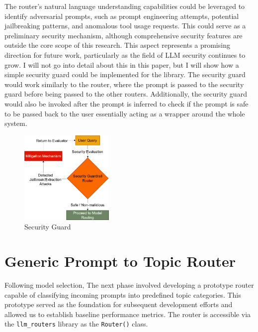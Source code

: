 The router's natural language understanding capabilities could be leveraged to identify adversarial prompts, such as prompt engineering attempts, potential jailbreaking patterns, and anomalous tool usage requests. This could serve as a preliminary security mechanism, although comprehensive security features are outside the core scope of this research. This aspect represents a promising direction for future work, particularly as the field of LLM security continues to grow. I will not go into detail about this in this paper, but I will show how a simple security guard could be implemented for the library. The security guard would work similarly to the router, where the prompt is passed to the security guard before being passed to the other routers. Additionally, the security guard would also be invoked after the prompt is inferred to check if the prompt is safe to be passed back to the user essentially acting as a wrapper around the whole system. 

\begin{figure}[H]
    \centering
    \includegraphics[width=0.4\textwidth]{figures/security-router.png}
    \caption{Security Guard}
    \label{fig:security_guard}
\end{figure}







\section{Generic Prompt to Topic Router}
\label{sec:generic_router_dev}


Following model selection, The next phase involved developing a prototype router capable of classifying incoming prompts into predefined topic categories. This prototype served as the foundation for subsequent development efforts and allowed us to establish baseline performance metrics. The router is accessible via the \texttt{llm\_routers} library as the \texttt{Router()} class.

